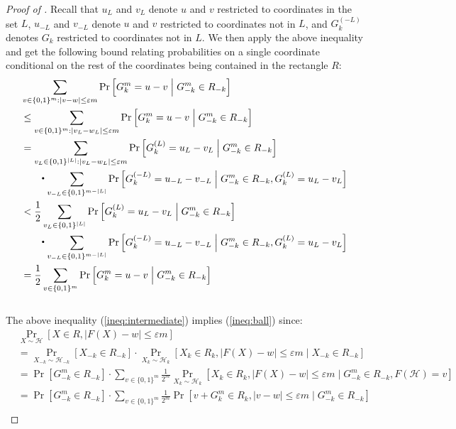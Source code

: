 \documentclass{toc}
\newcommand{\Cond}{\;\Big|\;}
\newcommand{\follows}{\ensuremath{\sim}}
\newcommand{\zo}{\ensuremath{ \{ 0, 1 \} }}
\newcommand{\gap}{\ensuremath{\varepsilon}}
\begin{document}
\begin{proof}[Proof of ]
        Recall that $u_L$ and $v_L$ denote $u$ and $v$ restricted to coordinates in the set $L$, $u_{-L}$ and $v_{-L}$ denote $u$ and $v$ restricted to coordinates not in $L$, and $G_k^{(-L)}$ denotes $G_k$ restricted to coordinates not in $L$. We then apply the above inequality and get the following bound relating probabilities on a single coordinate conditional on the rest of the coordinates being contained in the rectangle $R$:
		\begin{align}
			& \sum_{v\in\zo^m: \left|v-w\right| \le  \gap m }\Pr\left[ G^m_k = u-v \Cond G^m_{-k}\in R_{-k}  \right] \notag\\
			&\le  \sum_{v\in\zo^m: \left|v_L-w_L\right| \le  \gap m }\Pr\left[ G^m_k = u-v \Cond G^m_{-k}\in R_{-k}  \right] \notag\\
			&=  \sum_{v_L\in\zo^{|L|}: \left|v_L-w_L\right| \le  \gap m }\Pr\left[ G^{(L)}_k = u_L-v_L \Cond G^m_{-k}\in R_{-k}  \right] \notag\\
			& \qquad {\Large\boldsymbol{\cdot}} \sum_{v_{-L}\in \zo^{m-|L|}} \Pr\left[ G^{(-L)}_k = u_{-L}-v_{-L} \Cond G^m_{-k}\in R_{-k},G^{(L)}_k = u_L-v_L  \right]  \notag\\
			&<  \frac{1}{2} \sum_{v_L\in\zo^{|L|} }\Pr\left[ G^{(L)}_k = u_L-v_L \Cond G^m_{-k}\in R_{-k}  \right] \notag\\
			& \qquad {\Large\boldsymbol{\cdot}} \sum_{v_{-L}\in \zo^{m-|L|}} \Pr\left[ G^{(-L)}_k = u_{-L}-v_{-L} \Cond G^m_{-k}\in R_{-k},G^{(L)}_k = u_L-v_L  \right]  \notag\\
			&= \frac{1}{2} \sum_{v\in\zo^{m} }\Pr\left[ G^{m}_k = u-v \Cond G^m_{-k}\in R_{-k}  \right] \label{ineq:intermediate}
		\end{align}
		\\
		The above inequality (\ref{ineq:intermediate}) implies (\ref{ineq:ball}) since:
		\begin{align*}
			 & \Pr_{X\follows \mathcal{H}}\left[ X\in R, \left|F(X)-w\right|\le \gap m \right] \\
			&= \Pr_{X_{-k}\follows \mathcal{H}_{-k}}\left[ X_{-k}\in R_{-k} \right]
			\cdot \Pr_{X_k\follows \mathcal{H}_k}\left[ X_k\in R_k, \left|F(X)-w\right|\le \gap m \Cond X_{-k}\in R_{-k}  \right]\\
			&= \Pr\left[ G^m_{-k}\in R_{-k} \right]
			\cdot \sum_{v\in\zo^m}\frac{1}{2^m}\Pr_{X_k\follows \mathcal{H}_k}\left[ X_k\in R_k, \left|F(X)-w\right|\le \gap m \Cond G^m_{-k}\in R_{-k},F(\mathcal{H})=v  \right]\\
			&= \Pr\left[ G^m_{-k}\in R_{-k} \right]
			\cdot \sum_{v\in\zo^m}\frac{1}{2^m}\Pr\left[ v+ G^m_k\in R_k, \left|v-w\right|\le \gap m \Cond G^m_{-k}\in R_{-k}  \right]\\

\end{align*}
\end{proof}
\end{document}
